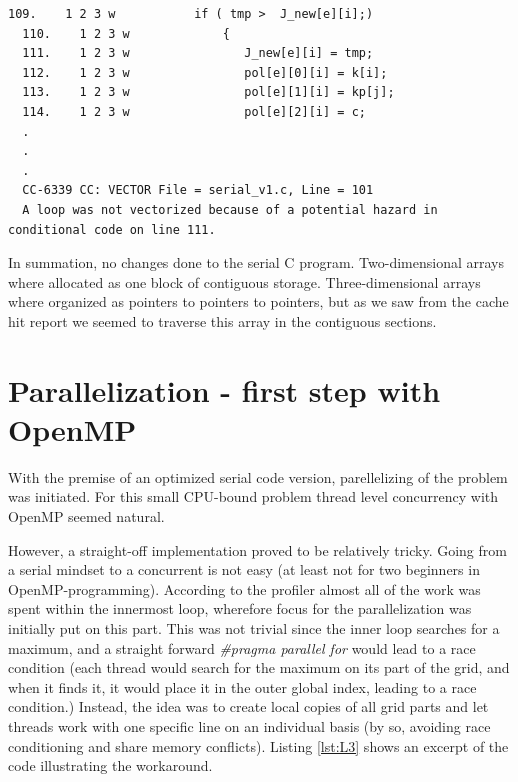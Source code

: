 \documentclass[12pt]{article}
\begin{document}
\begin{lstlisting}[caption=Cray C Compiler report snippet - code analysis, label={lst:L2}]
  109.    1 2 3 w           if ( tmp >  J_new[e][i];)
  110.    1 2 3 w             {
  111.    1 2 3 w                J_new[e][i] = tmp;
  112.    1 2 3 w                pol[e][0][i] = k[i];
  113.    1 2 3 w                pol[e][1][i] = kp[j];
  114.    1 2 3 w                pol[e][2][i] = c;
  .
  .
  .
  CC-6339 CC: VECTOR File = serial_v1.c, Line = 101
  A loop was not vectorized because of a potential hazard in conditional code on line 111.
\end{lstlisting}

In summation,  no changes done to the serial C program. Two-dimensional arrays where allocated as one block of contiguous storage. Three-dimensional arrays where organized as pointers to pointers to pointers, but as we saw from the cache hit report we seemed to traverse this array in the contiguous sections. 

\section*{Parallelization - first step with OpenMP}
With the premise of an optimized serial code version, parellelizing of the problem was initiated. For this small CPU-bound problem thread level concurrency with OpenMP seemed natural.

However, a straight-off implementation proved to be relatively tricky. Going from a serial mindset to a concurrent is not easy (at least not for two beginners in OpenMP-programming). According to the profiler almost all of the work was spent within the innermost loop, wherefore focus for the parallelization was initially put on this part. This was not trivial since the inner loop searches for a maximum, and a straight forward \emph{\color{Plum}\#pragma parallel \color{Orange} for} would lead to a race condition (each thread would search for the maximum on its part of the grid, and when it finds it, it would place it in the outer global index, leading to a race condition.) Instead, the idea was to create local copies of all grid parts and let threads work with one specific line on an individual basis (by so, avoiding race conditioning and share memory conflicts). Listing \ref{lst:L3} shows an excerpt of the code illustrating the workaround. 
\end{document}
